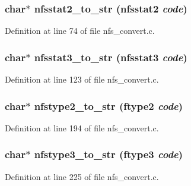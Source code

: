 \subsubsection[{nfsstat2\_\-to\_\-str}]{\setlength{\rightskip}{0pt plus 5cm}char$\ast$ nfsstat2\_\-to\_\-str (nfsstat2 {\em code})}\label{nfs__convert_8c_afe1a009aa12e4010f72e91e34c0b69be}


Definition at line 74 of file nfs\_\-convert.c.
\subsubsection[{nfsstat3\_\-to\_\-str}]{\setlength{\rightskip}{0pt plus 5cm}char$\ast$ nfsstat3\_\-to\_\-str (nfsstat3 {\em code})}\label{nfs__convert_8c_a2e00e2efee8b1a0234dfcfa69126094e}


Definition at line 123 of file nfs\_\-convert.c.
\subsubsection[{nfstype2\_\-to\_\-str}]{\setlength{\rightskip}{0pt plus 5cm}char$\ast$ nfstype2\_\-to\_\-str (ftype2 {\em code})}\label{nfs__convert_8c_acd481d151104f463a8fa777a96b85ecd}


Definition at line 194 of file nfs\_\-convert.c.
\subsubsection[{nfstype3\_\-to\_\-str}]{\setlength{\rightskip}{0pt plus 5cm}char$\ast$ nfstype3\_\-to\_\-str (ftype3 {\em code})}\label{nfs__convert_8c_a9d4214ccfda180f881344e77ce947fe0}


Definition at line 225 of file nfs\_\-convert.c.